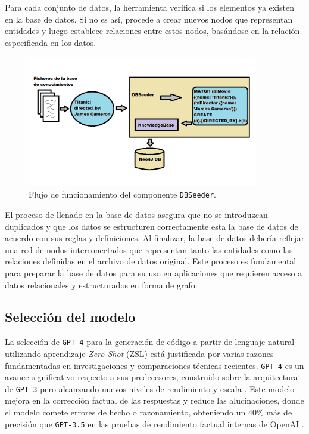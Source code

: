 Para cada conjunto de datos, la herramienta verifica si los elementos ya existen en la base de datos. Si no es así, procede a crear nuevos nodos que representan entidades y luego establece relaciones entre estos nodos, basándose en la relación especificada en los datos.

\begin{figure}[H]\label{dbseeder}
	\centering
	\includegraphics[width = 0.9\textwidth]{./Graphics/dbseeder}
	\caption{Flujo de funcionamiento del componente \texttt{DBSeeder}.}
\end{figure}

El proceso de llenado en la base de datos asegura que no se introduzcan duplicados y que los datos se estructuren correctamente esta la base de datos de acuerdo con sus reglas y definiciones. Al finalizar, la base de datos debería reflejar una red de nodos interconectados que representan tanto las entidades como las relaciones definidas en el archivo de datos original. Este proceso es fundamental para preparar la base de datos para su uso en aplicaciones que requieren acceso a datos relacionales y estructurados en forma de grafo.

\subsection{Selección del modelo} \label{model_selection}

La selección de \texttt{GPT-4} para la generación de código a partir de lenguaje natural utilizando aprendizaje \textit{Zero-Shot} (ZSL) está justificada por varias razones fundamentadas en investigaciones y comparaciones técnicas recientes.  \texttt{GPT-4} es un avance significativo respecto a sus predecesores, construido sobre la arquitectura de \texttt{GPT-3} pero alcanzando nuevos niveles de rendimiento y escala \cite{gpt4}. Este modelo mejora en la corrección factual de las respuestas y reduce las alucinaciones, donde el modelo comete errores de hecho o razonamiento, obteniendo un $40\%$ más de precisión que  \texttt{GPT-3.5} en las pruebas de rendimiento factual internas de OpenAI \cite{gpt4}.

